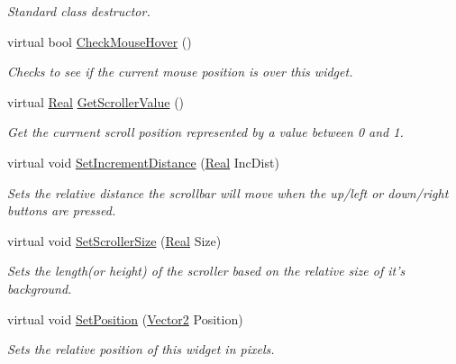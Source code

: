 \begin{DoxyCompactItemize}
\begin{DoxyCompactList}\small\item\em Standard class destructor. \item\end{DoxyCompactList}\item 
virtual bool \hyperlink{classphys_1_1UI_1_1Scrollbar_a8afdd63e36a7fdc15bd8660d9800f2c5}{CheckMouseHover} ()
\begin{DoxyCompactList}\small\item\em Checks to see if the current mouse position is over this widget. \item\end{DoxyCompactList}\item 
virtual \hyperlink{namespacephys_af7eb897198d265b8e868f45240230d5f}{Real} \hyperlink{classphys_1_1UI_1_1Scrollbar_abd70ba640ef9475a77334aa209121812}{GetScrollerValue} ()
\begin{DoxyCompactList}\small\item\em Get the currnent scroll position represented by a value between 0 and 1. \item\end{DoxyCompactList}\item 
virtual void \hyperlink{classphys_1_1UI_1_1Scrollbar_aad3de181a665a2296ae4f6dc1186470d}{SetIncrementDistance} (\hyperlink{namespacephys_af7eb897198d265b8e868f45240230d5f}{Real} IncDist)
\begin{DoxyCompactList}\small\item\em Sets the relative distance the scrollbar will move when the up/left or down/right buttons are pressed. \item\end{DoxyCompactList}\item 
virtual void \hyperlink{classphys_1_1UI_1_1Scrollbar_af5f791a4633e1d090dded18918789a00}{SetScrollerSize} (\hyperlink{namespacephys_af7eb897198d265b8e868f45240230d5f}{Real} Size)
\begin{DoxyCompactList}\small\item\em Sets the length(or height) of the scroller based on the relative size of it's background. \item\end{DoxyCompactList}\item 
virtual void \hyperlink{classphys_1_1UI_1_1Scrollbar_a36d82993b031b7be6da66fff8ca2c2d0}{SetPosition} (\hyperlink{classphys_1_1Vector2}{Vector2} Position)
\begin{DoxyCompactList}\small\item\em Sets the relative position of this widget in pixels. \item\end{DoxyCompactList}\item 

\end{DoxyCompactItemize}
